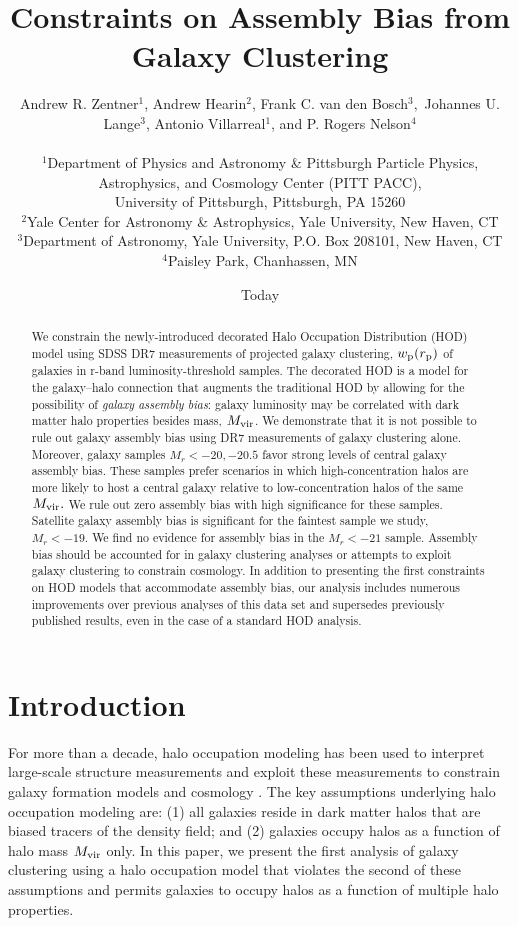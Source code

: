 \documentclass[usenatbib,usegraphicx,letterpaper]{mn2e}
\title[Clustering Constraints on Assembly Bias]
{
Constraints on Assembly Bias from Galaxy Clustering
}
\author[Zentner et al.]
{Andrew R. Zentner$^{1}$, Andrew Hearin$^{2}$, Frank C. van den Bosch$^{3},$ \newauthor
Johannes U. Lange$^{3}$, Antonio Villarreal$^{1}$, and P. Rogers Nelson$^{4}$\\ \\
$^1$Department of Physics and Astronomy \& Pittsburgh Particle Physics, Astrophysics, and Cosmology Center (PITT PACC),\\ University of Pittsburgh, Pittsburgh, PA 15260\\
$^2$Yale Center for Astronomy \& Astrophysics, Yale University, New Haven, CT\\
$^3$Department of Astronomy, Yale University, P.O. Box 208101, New Haven, CT\\
$^4$Paisley Park, Chanhassen, MN\\
}
\date{Today}
\newcommand{\mvir}{M_{\rm vir}}
\newcommand{\wprp}{w_{\mathrm{p}}}
\newcommand{\magr}{M_r}
\begin{document}
\maketitle
\begin{abstract}
  We constrain the newly-introduced decorated Halo Occupation Distribution (HOD) 
  model using SDSS DR7 measurements of projected galaxy clustering, $\wprp (r_{\rm p})$ 
  of galaxies in r-band luminosity-threshold samples. 
  The decorated HOD is a model for the galaxy--halo
  connection that augments the traditional HOD by allowing for the possibility of 
  {\em galaxy assembly bias}: galaxy luminosity may be correlated with dark matter halo
  properties besides mass, $\mvir$. We demonstrate that it
  is not possible to rule out galaxy assembly bias using DR7 measurements of galaxy 
  clustering alone. Moreover, galaxy samples $\magr<-20, -20.5$
  favor strong levels of central galaxy assembly bias. These samples prefer scenarios  
  in which high-concentration halos are more likely to host a central galaxy
  relative to low-concentration halos of the same $\mvir.$ We rule out
  zero assembly bias with high significance for these
  samples. Satellite galaxy assembly bias is significant for the
  faintest sample we study, $\magr<-19.$ We find no evidence for
  assembly bias in the $\magr<-21$ sample. Assembly bias should be accounted for 
  in galaxy clustering analyses or attempts to exploit galaxy clustering to constrain cosmology. 
  In addition to presenting the first constraints on HOD models that accommodate assembly bias, our analysis 
  includes numerous improvements over previous analyses of this data set and 
  supersedes previously published results, even in the case of a standard HOD analysis.
\end{abstract}

\section{Introduction}
\label{section:introduction}

For more than a decade, halo occupation modeling has been used to
interpret large-scale structure measurements and exploit these
measurements to constrain galaxy formation models and cosmology
\citep[e.g.,][]{yang03,tinker05,zehavi05a,
  porciani06,vdBosch07,Zheng07,conroy_wechsler09,yang09b,zehavi_etal11,guo_etal11b,
  wake_etal11,yang11a,yang12,leauthaud_etal12,rod_puebla12,tinker_etal13,cacciato_etal13,
  more_etal13,guo_etal14,zu_mandelbaum15b}. The key assumptions
underlying halo occupation modeling are: (1) all galaxies reside in
dark matter halos that are biased tracers of the density field; and
(2) galaxies occupy halos as a function of halo mass $\mvir$ only. 
In this paper, we present the first analysis of galaxy clustering using 
a halo occupation model that violates the second of these assumptions 
and permits galaxies to occupy halos as a function of multiple halo properties.
\end{document}

